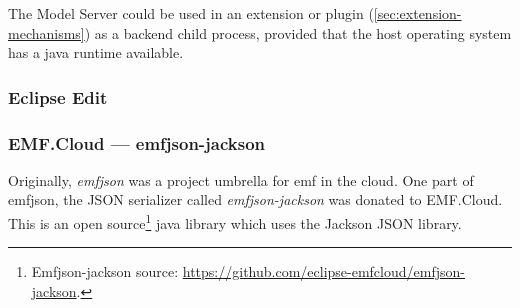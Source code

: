 The Model Server could be used in an extension or plugin (\cref{sec:extension-mechanisms}) as a backend child process, provided that the host operating system has a java runtime available.

\subsubsection{Eclipse Edit}

\subsubsection{EMF.Cloud --- emfjson-jackson}
Originally, \emph{emfjson} was a project umbrella for \gls{emf} in the \gls{cloud}.
One part of emfjson, the \gls{JSON} serializer called \emph{emfjson-jackson} was donated to EMF.Cloud.
This is an \gls{open source}\footnote{Emfjson-jackson source: \href{https://github.com/eclipse-emfcloud/emfjson-jackson}{https://github.com/eclipse-emfcloud/emfjson-jackson}.} java library which uses the Jackson JSON library.


